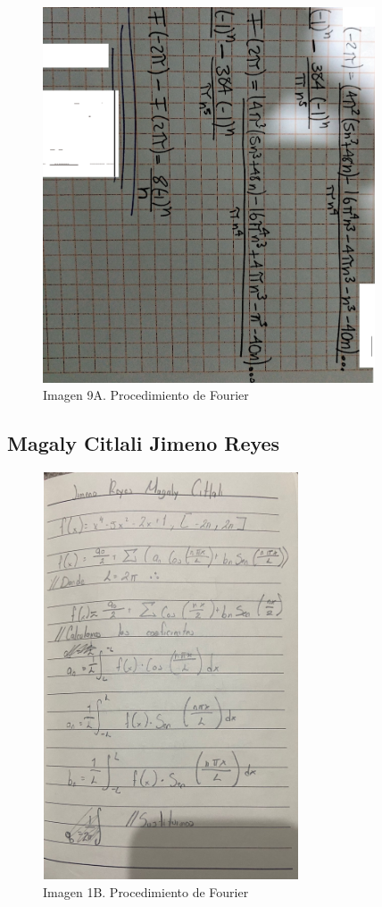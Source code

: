 \begin{figure}[H]
	\centering
	\includegraphics[width=3.88021in,height=4.37099in]{media/image43.png}
	\caption{Imagen 9A. Procedimiento de Fourier}
\end{figure}

\subsection{Magaly Citlali Jimeno Reyes}

\begin{figure}[H]
	\centering
	\includegraphics[width=2.98958in,height=4.74434in]{media/image13.jpg}
	\caption{Imagen 1B. Procedimiento de Fourier}
\end{figure}

